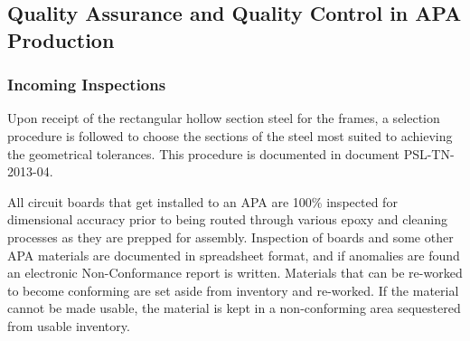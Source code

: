 \begin{comment}
Design development work is in progress. The interface frames have been replaced at either end by retractable linear guided shafts. These can be withdrawn systematically to allow passing of the winding head around the frame over the full height of the frame. These shafts have conical ends and locate in shafts that are fixed to the internal frame tube to provide guided location. This design change does not alter the design of the frame, however we do not consider the riv-nuts are required and suggest that these should be omitted. The design also allows for rotation in the winding machine or the process cart for some assembly or process operations such as soldering. This is achieved using the existing features in the APA frame with the addition of a spine support at the head end.  It should also be possible to carry out board installation and gluing \& soldering in the winding machine. This eliminates the need to transfer the APA to the process cart for the whole of the production operation. This is inherently a safer production method as it cuts down the amount of handling of the APA. The development design proposal can be seen in figure??
\end{itemize}

\begin{dunefigure}[Winding Machine Dev]{fig:winding_dev}
{Winding machine design development.}
\texttt{[image: Winding-machine-design-development.jpg]} 
\end{dunefigure}
\end{comment}


\subsection{Quality Assurance and Quality Control in APA Production}
\label{sec:fdsp-apa-qa}

\subsubsection{Incoming Inspections}  

Upon receipt of the rectangular hollow section steel for the frames, a selection procedure is followed to choose the sections of the steel most suited to achieving the geometrical tolerances. This procedure is documented in document PSL-TN-2013-04.  

All circuit boards that get installed to an APA are 100\% inspected for dimensional accuracy prior to being routed through various epoxy and cleaning processes as they are prepped for assembly. Inspection of boards and some other APA materials are documented in spreadsheet format, and if anomalies are found an electronic Non-Conformance report is written.  Materials that can be re-worked to become conforming are set aside from inventory and re-worked.  If the material cannot be made usable, the material is kept in a non-conforming area sequestered from usable inventory.   

